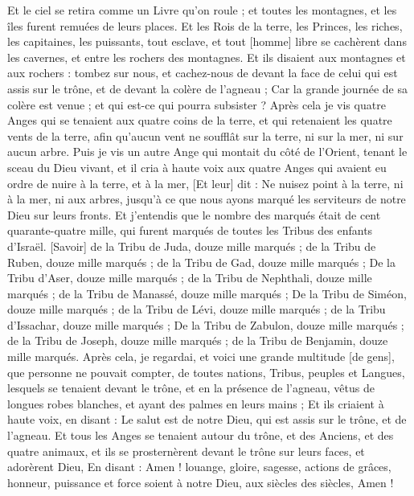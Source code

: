 \begin{multicols}{2}
Et le ciel se retira comme un Livre qu'on roule ; et toutes les montagnes, et les îles furent remuées de leurs places.
Et les Rois de la terre, les Princes, les riches, les capitaines, les puissants, tout esclave, et tout [homme] libre se cachèrent dans les cavernes, et entre les rochers des montagnes.
Et ils disaient aux montagnes et aux rochers : tombez sur nous, et cachez-nous de devant la face de celui qui est assis sur le trône, et de devant la colère de l'agneau ;
Car la grande journée de sa colère est venue ; et qui est-ce qui pourra subsister ?
\VerseOne{}Après cela je vis quatre Anges qui se tenaient aux quatre coins de la terre, et qui retenaient les quatre vents de la terre, afin qu'aucun vent ne soufflât sur la terre, ni sur la mer, ni sur aucun arbre.
Puis je vis un autre Ange qui montait du côté de l'Orient, tenant le sceau du Dieu vivant, et il cria à haute voix aux quatre Anges qui avaient eu ordre de nuire à la terre, et à la mer,
[Et leur] dit : Ne nuisez point à la terre, ni à la mer, ni aux arbres, jusqu'à ce que nous ayons marqué les serviteurs de notre Dieu sur leurs fronts.
Et j'entendis que le nombre des marqués était de cent quarante-quatre mille, qui furent marqués de toutes les Tribus des enfants d'Israël.
[Savoir] de la Tribu de Juda, douze mille marqués ; de la Tribu de Ruben, douze mille marqués ; de la Tribu de Gad, douze mille marqués ;
De la Tribu d'Aser, douze mille marqués ; de la Tribu de Nephthali, douze mille marqués ; de la Tribu de Manassé, douze mille marqués ;
De la Tribu de Siméon, douze mille marqués ; de la Tribu de Lévi, douze mille marqués ; de la Tribu d'Issachar, douze mille marqués ;
De la Tribu de Zabulon, douze mille marqués ; de la Tribu de Joseph, douze mille marqués ; de la Tribu de Benjamin, douze mille marqués.
Après cela, je regardai, et voici une grande multitude [de gens], que personne ne pouvait compter, de toutes nations, Tribus, peuples et Langues, lesquels se tenaient devant le trône, et en la présence de l'agneau, vêtus de longues robes blanches, et ayant des palmes en leurs mains ;
Et ils criaient à haute voix, en disant : Le salut est de notre Dieu, qui est assis sur le trône, et de l'agneau.
Et tous les Anges se tenaient autour du trône, et des Anciens, et des quatre animaux, et ils se prosternèrent devant le trône sur leurs faces, et adorèrent Dieu,
En disant : Amen ! louange, gloire, sagesse, actions de grâces, honneur, puissance et force soient à notre Dieu, aux siècles des siècles, Amen !

\end{multicols}
